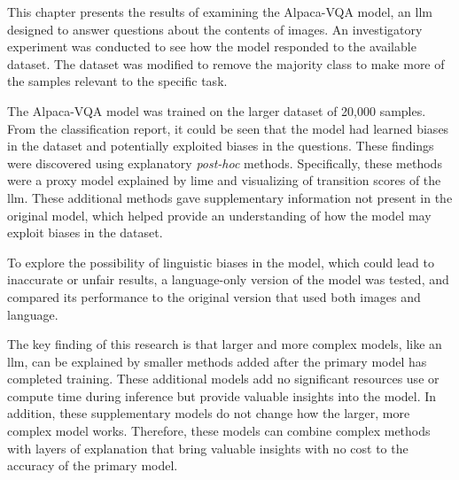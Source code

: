 This chapter presents the results of examining the Alpaca-VQA model, an \gls{llm} designed to answer questions about the contents of images. An investigatory experiment was conducted to see how the model responded to the available dataset. The dataset was modified to remove the majority class to make more of the samples relevant to the specific task.

The Alpaca-VQA model was trained on the larger dataset of 20,000 samples. From the classification report, it could be seen that the model had learned biases in the dataset and potentially exploited biases in the questions. These findings were discovered using explanatory \textit{post-hoc} methods. Specifically, these methods were a proxy model explained by \gls{lime} and visualizing of transition scores of the \gls{llm}. These additional methods gave supplementary information not present in the original model, which helped provide an understanding of how the model may exploit biases in the dataset. 

To explore the possibility of linguistic biases in the model, which could lead to inaccurate or unfair results, a language-only version of the model was tested, and compared its performance to the original version that used both images and language.

The key finding of this research is that larger and more complex models, like an \gls{llm}, can be explained by smaller methods added after the primary model has completed training. These additional models add no significant resources use or compute time during inference but provide valuable insights into the model. In addition, these supplementary models do not change how the larger, more complex model works. Therefore, these models can combine complex methods with layers of explanation that bring valuable insights with no cost to the accuracy of the primary model. 


